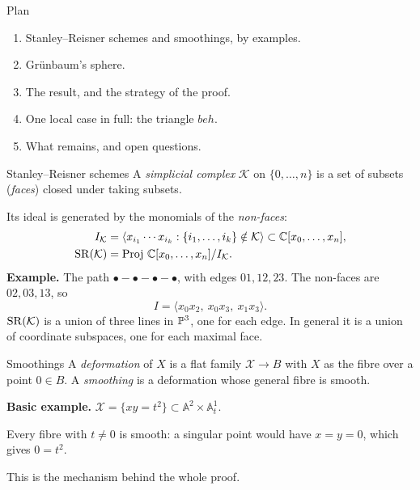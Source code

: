 \begin{frame}{Plan}
\begin{enumerate}
\setlength{\itemsep}{12pt}
\item Stanley--Reisner schemes and smoothings, by examples.
\item Grünbaum's sphere.
\item The result, and the strategy of the proof.
\item One local case in full: the triangle \(beh\).
\item What remains, and open questions.
\end{enumerate}
\end{frame}

\begin{frame}{Stanley--Reisner schemes}
A \emph{simplicial complex} \(\mathcal K\) on \(\{0,\dots,n\}\) is a set of subsets (\emph{faces}) closed under taking subsets.
\par\medskip
Its ideal is generated by the monomials of the \emph{non-faces}:
\begin{align*}
I_{\mathcal K}&=\langle x_{i_1}\cdots x_{i_k}:\{i_1,\dots,i_k\}\notin\mathcal K\rangle\subset\mathbb C[x_0,\dots,x_n],\\
\operatorname{SR}(\mathcal K)&=\operatorname{Proj}\,\mathbb C[x_0,\dots,x_n]/I_{\mathcal K}.
\end{align*}
\textbf{Example.} The path \(\bullet-\bullet-\bullet-\bullet\), with edges \(01,12,23\). The non-faces are \(02,03,13\), so
\[
\boxed{I=\langle x_0x_2,\ x_0x_3,\ x_1x_3\rangle.}
\]
\(\operatorname{SR}(\mathcal K)\) is a union of three lines in \(\mathbb P^3\), one for each edge. In general it is a union of coordinate subspaces, one for each maximal face.
\end{frame}

\begin{frame}{Smoothings}
A \emph{deformation} of \(X\) is a flat family \(\mathcal X\to B\) with \(X\) as the fibre over a point \(0\in B\). A \emph{smoothing} is a deformation whose general fibre is smooth.
\par\medskip
\textbf{Basic example.} \(\mathcal X=\{xy=t^2\}\subset\mathbb A^2\times\mathbb A^1_t\).
\begin{center}
\end{center}
Every fibre with \(t\ne0\) is smooth: a singular point would have \(x=y=0\), which gives \(0=t^2\).
\par\smallskip
This is the mechanism behind the whole proof.
\end{frame}


